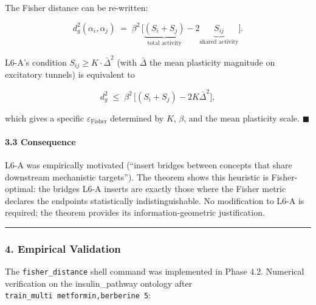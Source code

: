 \documentclass[
  11pt,
  a4paper,
]{article}
\begin{document}
The Fisher distance can be re-written:

\[
d_g^2(\alpha_i, \alpha_j) \;=\; \beta^2 \, \Big[ \underbrace{(S_i + S_j)}_{\text{total activity}} - 2 \underbrace{S_{ij}}_{\text{shared activity}} \Big].
\]

L6-A's condition \(S_{ij} \geq K \cdot \bar{\Delta}^2\) (with
\(\bar{\Delta}\) the mean plasticity magnitude on excitatory tunnels) is
equivalent to

\[
d_g^2 \;\leq\; \beta^2 \, \big[(S_i + S_j) - 2 K \bar{\Delta}^2\big],
\]

which gives a specific \(\varepsilon_\text{Fisher}\) determined by
\(K\), \(\beta\), and the mean plasticity scale. \(\blacksquare\)

\paragraph{3.3 Consequence}\label{consequence}

L6-A was empirically motivated (``insert bridges between concepts that
share downstream mechanistic targets''). The theorem shows this
heuristic is Fisher-optimal: the bridges L6-A inserts are exactly those
where the Fisher metric declares the endpoints statistically
indistinguishable. No modification to L6-A is required; the theorem
provides its information-geometric justification.

\begin{center}\rule{0.5\linewidth}{0.5pt}\end{center}

\subsubsection{4. Empirical Validation}\label{empirical-validation}

The \texttt{fisher\_distance} shell command was implemented in Phase
4.2. Numerical verification on the insulin\_pathway ontology after
\texttt{train\_multi\ metformin,berberine\ 5}:
\end{document}
